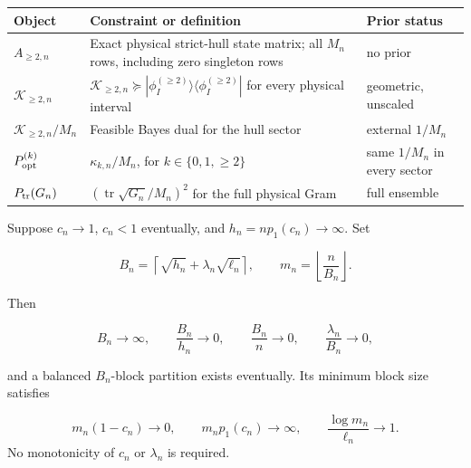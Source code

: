 \begin{center}
\small
\begin{tabularx}{\linewidth}{@{}lXl@{}}
\toprule
Object & Constraint or definition & Prior status\\
\midrule
\(A_{\ge2,n}\) & Exact physical strict-hull state matrix; all \(M_n\)
rows, including zero singleton rows & no prior\\
\(\mathcal K_{\ge2,n}\) &
\(\mathcal K_{\ge2,n}\succeq
 |\phi_I^{(\ge2)}\rangle\langle\phi_I^{(\ge2)}|\) for every
physical interval & geometric, unscaled\\
\(\mathcal K_{\ge2,n}/M_n\) & Feasible Bayes dual for the hull sector &
external \(1/M_n\)\\
\(P_{\rm opt}^{(k)}\) & \(\kappa_{k,n}/M_n\), for
\(k\in\{0,1,\ge2\}\) & same \(1/M_n\) in every sector\\
\(P_{\rm tr}(G_n)\) &
\((\operatorname{tr}\sqrt{G_n}/M_n)^2\) for the full physical Gram &
full ensemble\\
\bottomrule
\end{tabularx}
\end{center}

\begin{lemma}
\label{lem:supp-adaptive-block-parameters}
Suppose \(c_n\to1\), \(c_n<1\) eventually, and
\(h_n=np_1(c_n)\to\infty\).  Set

\[
 B_n=\left\lceil\sqrt{h_n}+\lambda_n\sqrt{\ell_n}\right\rceil,
 \qquad m_n=\left\lfloor\frac n{B_n}\right\rfloor.
\]

Then

\[
 B_n\to\infty,\qquad
 \frac{B_n}{h_n}\to0,\qquad
 \frac{B_n}{n}\to0,\qquad
 \frac{\lambda_n}{B_n}\to0,
\]

and a balanced \(B_n\)-block partition exists eventually.  Its minimum
block size satisfies

\[
 m_n(1-c_n)\to0,\qquad
 m_np_1(c_n)\to\infty,\qquad
 \frac{\log m_n}{\ell_n}\to1.
\]
No monotonicity of \(c_n\) or \(\lambda_n\) is required.
\end{lemma}

